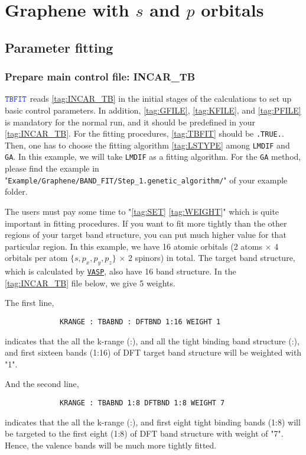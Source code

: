 \documentclass[a4paper,12pt]{scrartcl}
\newcommand{\tbfitname}{\textcolor{blue!85!white}{\texttt{TBFIT}}}
\begin{document}
\section{Graphene with $s$ and $p$ orbitals}
	\subsection{Parameter fitting}
		\subsubsection{Prepare main control file: INCAR\_TB}
		$\tbfitname$ reads \ref{tag:INCAR_TB} in the initial stages of the calculations to set up basic control parameters. In addition, \ref{tag:GFILE}, \ref{tag:KFILE}, and \ref{tag:PFILE} is mandatory for the normal run, and it should be predefined in your \ref{tag:INCAR_TB}.
		For the fitting procedures, \ref{tag:TBFIT} should be \texttt{.TRUE.}. Then, one has to choose the fitting algorithm \ref{tag:LSTYPE} among \texttt{LMDIF} and \texttt{GA}. In this example, we will take \texttt{LMDIF} as a fitting algorithm. For the \texttt{GA} method, please find the example in "\texttt{Example/Graphene/BAND\_FIT/Step\_1.genetic\_algorithm/}" of your example folder.
		 
	
		The users must pay some time to "\ref{tag:SET} \ref{tag:WEIGHT}" which is quite important in fitting procedures. If you want to fit more tightly than the other regions of your target band structure, you can put much higher value for that particular region. In this example, we have  16 atomic orbitals (2 atoms $\times$ 4 orbitals per atom $\{s, p_x, p_y, p_z\}$ $\times$ 2 spinors) in total. The target band structure, which is calculated by \href{https://www.vasp.at}{\texttt{VASP}}, also have 16 band structure. In the \ref{tag:INCAR_TB} file below, we give 5 weights. 
		
			The first line,
		    \begin{Verbatim}
             KRANGE : TBABND : DFTBND 1:16 WEIGHT 1
		    \end{Verbatim}
			indicates that the all the k-range (:), and all the tight binding band structure (:), and first sixteen bands (1:16) of DFT target band structure will be weighted with "1".

			And the second line,
		    \begin{Verbatim}
             KRANGE : TBABND 1:8 DFTBND 1:8 WEIGHT 7
		    \end{Verbatim}
			indicates that the all the k-range (:), and first eight tight binding bands (1:8) will be targeted to the first eight (1:8) of DFT band structure with weight of "7". Hence, the valence bands will be much more tightly fitted.
\end{document}
